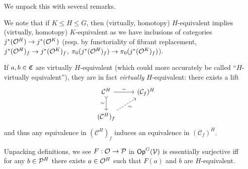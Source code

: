 \documentclass[a4paper,10pt
,draft
]{article}%
\renewcommand{\1}{\eta}%
\begin{document}
We unpack this with several remarks.

\begin{remark}
      \label{HK_EQUIV_REM}
      We note that if $K \leq H \leq G$, then (virtually, homotopy) $H$-equivalent implies (virtually, homotopy) $K$-equivalent
      as we have inclusions of categories
      $j^{\**}(\O^H) \to j^{\**}(\O^K)$
      (resp. by functoriality of fibrant replacement,
      $j^{\**}(\O^H)_f \to j^{\**}(\O^K)_f$,
      $\pi_0(j^{\**}(\O^H)_f) \to \pi_0(j^{\**}(\O^K)_f)$).
\end{remark}

\begin{remark}
      \label{HVIRT_REM}
      If $a,b\in \C$ are virtually $H$-equivalent (which could more accurately be called ``$H$-virtually equivalent''),
      they are in fact \textit{virtually} $H$-equivalent:
      there exists a lift
      \begin{equation}
            \label{FIBFIX_LIFT_EQ}
            \begin{tikzcd}
                  \mathcal C^H \arrow[d, tail, "\sim"'] \arrow[r, "\sim"]
                  &
                  (\mathcal C_f)^H
                  \\
                  (\mathcal C^H)_f \arrow[ur, dashed, "\sim"']
            \end{tikzcd}
      \end{equation}
      and thus any equivalence in $(\mathcal C^H)_f$ induces an equivalence in $(\mathcal C_f)^H$. 
\end{remark}

\begin{remark}
      \label{ESS_SUR_REM}
      Unpacking definitions, we see
      $F: \O \to \P$ in $\Op^G(\V)$ is essentially surjective iff
      for any $b \in \P^H$ there exists $a \in \O^H$ such that $F(a)$ and $b$ are $H$-equivalent.
\end{remark}
\end{document}
